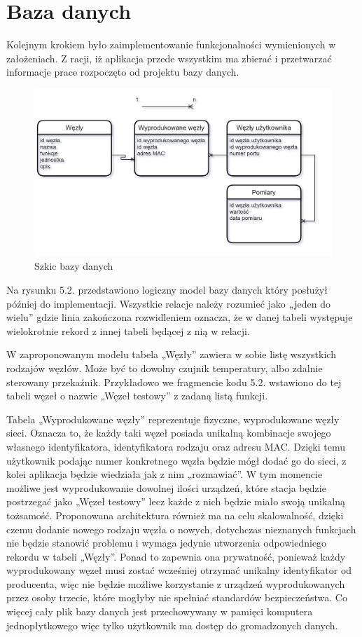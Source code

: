 \documentclass[12pt, twoside, openany]{mwrep}
\begin{document}
\section{Baza danych}
Kolejnym krokiem było zaimplementowanie funkcjonalności wymienionych w założeniach. Z racji, iż aplikacja przede wszystkim ma zbierać i przetwarzać informacje prace rozpoczęto od projektu bazy danych. 
\begin{figure}[H]
\centering
\includegraphics[width=\textwidth]{db}
\caption{Szkic bazy danych}
\end{figure}
\par
Na rysunku 5.2. przedstawiono logiczny model bazy danych który posłużył później do implementacji. Wszystkie relacje należy rozumieć jako „jeden do wielu” gdzie linia zakończona rozwidleniem oznacza, że w danej tabeli występuje wielokrotnie rekord z innej tabeli będącej z nią w relacji. \par
W zaproponowanym modelu tabela „Węzły” zawiera w sobie listę wszystkich rodzajów węzłów. Może być to dowolny czujnik temperatury, albo zdalnie sterowany przekaźnik. Przykładowo we fragmencie kodu 5.2. wstawiono do tej tabeli węzeł o nazwie „Węzeł testowy” z zadaną listą funkcji.  \par
Tabela „Wyprodukowane węzły” reprezentuje fizyczne, wyprodukowane węzły sieci. Oznacza to, że każdy taki węzeł posiada unikalną kombinacje swojego własnego identyfikatora, identyfikatora rodzaju oraz adresu MAC. Dzięki temu użytkownik podając numer konkretnego węzła będzie mógł dodać go do sieci, z kolei aplikacja będzie wiedziała jak z nim „rozmawiać”. W tym momencie możliwe jest wyprodukowanie dowolnej ilości urządzeń, które stacja będzie postrzegać jako „Węzeł testowy” lecz każde z nich będzie miało swoją unikalną tożsamość.
Proponowana architektura również ma na celu skalowalność, dzięki czemu dodanie nowego rodzaju węzła o nowych, dotychczas nieznanych funkcjach nie będzie stanowić problemu i wymaga jedynie utworzenia odpowiedniego rekordu w tabeli „Węzły”. Ponad to zapewnia ona prywatność, ponieważ każdy wyprodukowany węzeł musi zostać wcześniej otrzymać unikalny identyfikator od producenta, więc nie będzie możliwe korzystanie z urządzeń wyprodukowanych przez osoby trzecie, które mogłyby nie spełniać standardów bezpieczeństwa. Co więcej cały plik bazy danych jest przechowywany w pamięci komputera jednopłytkowego więc tylko użytkownik ma dostęp do gromadzonych danych.
\end{document}
